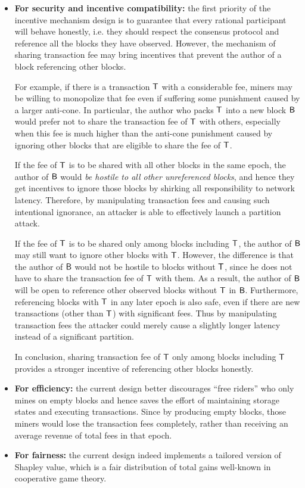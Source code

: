 	\begin{itemize}
		\item {\bf For security and incentive compatibility:} 
		the first priority of the incentive mechanism design is to guarantee that every rational participant will behave honestly, i.e. they should respect the consensus protocol and reference all the blocks they have observed.
		However, the mechanism of sharing transaction fee may bring incentives that prevent the author of a block referencing other blocks.

		For example, if there is a transaction $\textsf{T}$ with a considerable fee, miners may be willing to monopolize that fee even if suffering some punishment caused by a larger anti-cone.
		In particular, the author who packs $\textsf{T}$ into a new block $\textsf{B}$ would prefer not to share the transaction fee of $\textsf{T}$ with others, especially when this fee is much higher than the anti-cone punishment caused by ignoring other blocks that are eligible to share the fee of $\textsf{T}$.

		If the fee of $\textsf{T}$ is to be shared with all other blocks in the same epoch, the author of $\textsf{B}$ would \emph{be hostile to all other unreferenced blocks}, and hence they get incentives to ignore those blocks by shirking all responsibility to network latency. 
		Therefore, by manipulating transaction fees and causing such intentional ignorance, an attacker is able to effectively launch a partition attack.

		If the fee of $\textsf{T}$ is to be shared only among blocks including $\textsf{T}$, the author of $\textsf{B}$ may still want to ignore other blocks with $\textsf{T}$. 
		However, the difference is that the author of $\textsf{B}$ would not be hostile to blocks without $\textsf{T}$, since he does not have to share the transaction fee of $\textsf{T}$ with them.
		As a result, the author of $\textsf{B}$ will be open to reference other observed blocks without $\textsf{T}$ in $\textsf{B}$.
		Furthermore, referencing blocks with $\textsf{T}$ in any later epoch is also safe, even if there are new transactions (other than $\textsf{T}$) with significant fees.
		Thus by manipulating transaction fees the attacker could merely cause a slightly longer latency instead of a significant partition.

		In conclusion, sharing transaction fee of $\textsf{T}$ only among blocks including $\textsf{T}$ provides a stronger incentive of referencing other blocks honestly.

		\item {\bf For efficiency:} 
		the current design better discourages ``free riders'' who only mines on empty blocks and hence saves the effort of  maintaining storage states and executing transactions.
		Since by producing empty blocks, those miners would lose the transaction fees completely, rather than receiving an average revenue of total fees in that epoch.

		\item {\bf For fairness:}
		the current design indeed implements a tailored version of Shapley value, which is a fair distribution of total gains well-known in cooperative game theory.
	\end{itemize}




